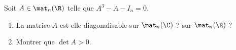 \begin{enonce}
\begin{exercise}[ID={RMS 122-2 E1199 ENSAM PSI},subtitle={},tags={}, difficulty={0}]
Soit $A\in\mat_n(\R)$ telle que $A^3-A-I_n=0$.
\begin{enumerate}
  \item La matrice $A$ est-elle diagonalisable sur $\mat_n(\C)$ ? sur $\mat_n(\R)$ ?
  \item Montrer que $\det A>0$.
\end{enumerate}
\end{exercise}
\begin{solution}
\end{solution}
\end{enonce}
